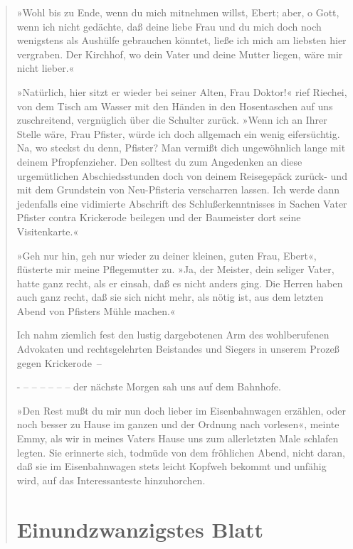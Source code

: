 \begin{verse}
»Wohl bis zu Ende, wenn du mich mitnehmen willst, Ebert; aber, o
Gott, wenn ich nicht gedächte, daß deine liebe Frau und du mich
doch noch wenigstens als Aushülfe gebrauchen könntet, ließe ich
mich am liebsten hier vergraben. Der Kirchhof, wo dein Vater und
deine Mutter liegen, wäre mir nicht lieber.«

»Natürlich, hier sitzt er wieder bei seiner Alten, Frau Doktor!«
rief Riechei, von dem Tisch am Wasser mit den Händen in den
Hosentaschen auf uns zuschreitend, vergnüglich über die Schulter
zurück. »Wenn ich an Ihrer Stelle wäre, Frau Pfister, würde ich
doch allgemach ein wenig eifersüchtig. Na, wo steckst du denn,
Pfister? Man vermißt dich ungewöhnlich lange mit deinem
Pfropfenzieher. Den solltest du zum Angedenken an diese
urgemütlichen Abschiedsstunden doch von deinem Reisegepäck zurück-
und mit dem Grundstein von Neu-Pfisteria verscharren lassen. Ich
werde dann jedenfalls eine vidimierte Abschrift des
Schlußerkenntnisses in Sachen Vater Pfister contra Krickerode
beilegen und der Baumeister dort seine Visitenkarte.«

»Geh nur hin, geh nur wieder zu deiner kleinen, guten Frau, Ebert«,
flüsterte mir meine Pflegemutter zu. »Ja, der Meister, dein seliger
Vater, hatte ganz recht, als er einsah, daß es nicht anders ging.
Die Herren haben auch ganz recht, daß sie sich nicht mehr, als
nötig ist, aus dem letzten Abend von Pfisters Mühle machen.«

Ich nahm ziemlich fest den lustig dargebotenen Arm des
wohlberufenen Advokaten und rechtsgelehrten Beistandes und Siegers
in unserem Prozeß gegen Krickerode~–

- – – – – – – der nächste Morgen sah uns auf dem Bahnhofe.

»Den Rest mußt du mir nun doch lieber im Eisenbahnwagen erzählen,
oder noch besser zu Hause im ganzen und der Ordnung nach vorlesen«,
meinte Emmy, als wir in meines Vaters Hause uns zum allerletzten
Male schlafen legten. Sie erinnerte sich, todmüde von dem
fröhlichen Abend, nicht daran, daß sie im Eisenbahnwagen stets
leicht Kopfweh bekommt und unfähig wird, auf das Interessanteste
hinzuhorchen.

\section{Einundzwanzigstes Blatt}


\end{verse}
